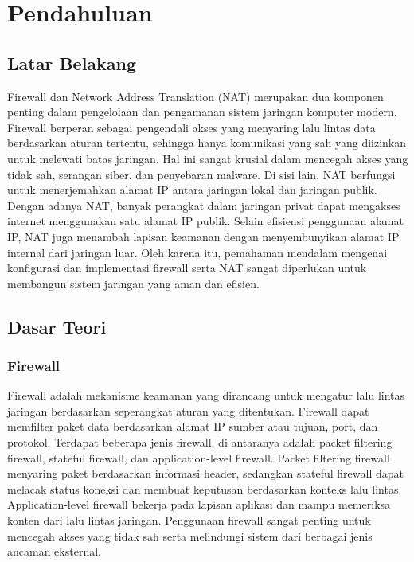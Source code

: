 \section{Pendahuluan}
\subsection*{Latar Belakang}

Firewall dan Network Address Translation (NAT) merupakan dua komponen penting dalam pengelolaan dan pengamanan sistem jaringan komputer modern. Firewall berperan sebagai pengendali akses yang menyaring lalu lintas data berdasarkan aturan tertentu, sehingga hanya komunikasi yang sah yang diizinkan untuk melewati batas jaringan. Hal ini sangat krusial dalam mencegah akses yang tidak sah, serangan siber, dan penyebaran malware. Di sisi lain, NAT berfungsi untuk menerjemahkan alamat IP antara jaringan lokal dan jaringan publik. Dengan adanya NAT, banyak perangkat dalam jaringan privat dapat mengakses internet menggunakan satu alamat IP publik. Selain efisiensi penggunaan alamat IP, NAT juga menambah lapisan keamanan dengan menyembunyikan alamat IP internal dari jaringan luar. Oleh karena itu, pemahaman mendalam mengenai konfigurasi dan implementasi firewall serta NAT sangat diperlukan untuk membangun sistem jaringan yang aman dan efisien.

\subsection*{Dasar Teori}

\subsubsection{Firewall}

Firewall adalah mekanisme keamanan yang dirancang untuk mengatur lalu lintas jaringan berdasarkan seperangkat aturan yang ditentukan. Firewall dapat memfilter paket data berdasarkan alamat IP sumber atau tujuan, port, dan protokol. Terdapat beberapa jenis firewall, di antaranya adalah packet filtering firewall, stateful firewall, dan application-level firewall. Packet filtering firewall menyaring paket berdasarkan informasi header, sedangkan stateful firewall dapat melacak status koneksi dan membuat keputusan berdasarkan konteks lalu lintas. Application-level firewall bekerja pada lapisan aplikasi dan mampu memeriksa konten dari lalu lintas jaringan. Penggunaan firewall sangat penting untuk mencegah akses yang tidak sah serta melindungi sistem dari berbagai jenis ancaman eksternal.

